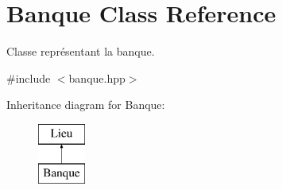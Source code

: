 \hypertarget{class_banque}{\section{Banque Class Reference}
\label{class_banque}
}


Classe représentant la banque.  




{\ttfamily \#include $<$banque.\-hpp$>$}

Inheritance diagram for Banque\-:\begin{figure}[H]
\begin{center}
\leavevmode
\includegraphics[height=2.000000cm]{class_banque}
\end{center}
\end{figure}
